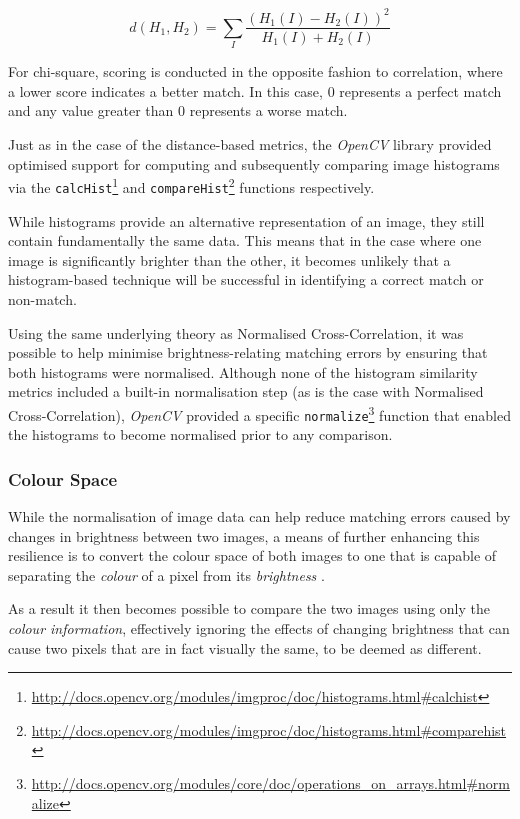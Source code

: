 \begin{equation}
d(H_{1}, H_{2}) = \sum\limits_{I}\frac{(H_{1}(I) - H_{2}(I))^2}{H_{1}(I) + H_{2}(I)}
\end{equation}

For chi-square, scoring is conducted in the opposite fashion to correlation, where a lower score indicates a better match. In this case, 0 represents a perfect match and any value greater than 0 represents a worse match.

Just as in the case of the distance-based metrics, the \textit{OpenCV} library provided optimised support for computing and subsequently comparing image histograms via the \texttt{calcHist}\footnote{\url{http://docs.opencv.org/modules/imgproc/doc/histograms.html#calchist}} and \texttt{compareHist}\footnote{\url{http://docs.opencv.org/modules/imgproc/doc/histograms.html#comparehist}} functions respectively. 

While histograms provide an alternative representation of an image, they still contain fundamentally the same data. This means that in the case where one image is significantly brighter than the other, it becomes unlikely that a histogram-based technique will be successful in identifying a correct match or non-match. 

Using the same underlying theory as Normalised Cross-Correlation, it was possible to help minimise brightness-relating matching errors by ensuring that both histograms were normalised. Although none of the histogram similarity metrics included a built-in normalisation step (as is the case with Normalised Cross-Correlation), \textit{OpenCV} provided a specific \texttt{normalize}\footnote{\url{http://docs.opencv.org/modules/core/doc/operations_on_arrays.html#normalize}} function that enabled the histograms to become normalised prior to any comparison.

\subsubsection{Colour Space}

While the normalisation of image data can help reduce matching errors caused by changes in brightness between two images, a means of further enhancing this resilience is to convert the colour space of both images to one that is capable of separating the \textit{colour} of a pixel from its \textit{brightness} \cite{ulrich-nourbakhsh}. 

As a result it then becomes possible to compare the two images using only the \textit{colour information}, effectively ignoring the effects of changing brightness that can cause two pixels that are in fact visually the same, to be deemed as different.

